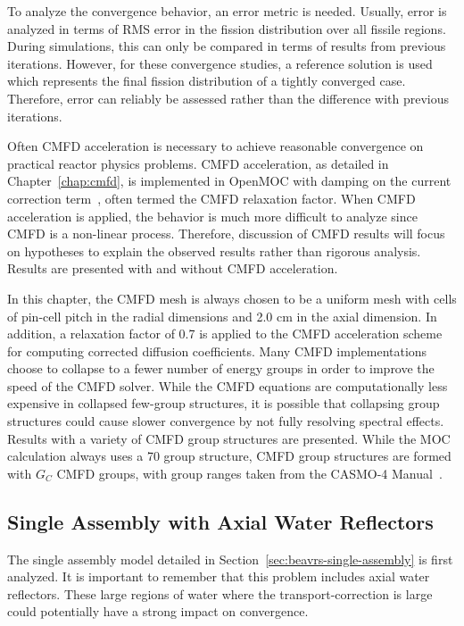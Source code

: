 To analyze the convergence behavior, an error metric is needed. Usually, error is analyzed in terms of RMS error in the fission distribution over all fissile regions. During simulations, this can only be compared in terms of results from previous iterations. However, for these convergence studies, a reference solution is used which represents the final fission distribution of a tightly converged case. Therefore, error can reliably be assessed rather than the difference with previous iterations.

Often \ac{CMFD} acceleration is necessary to achieve reasonable convergence on practical reactor physics problems. \ac{CMFD} acceleration, as detailed in Chapter~\ref{chap:cmfd}, is implemented in OpenMOC with damping on the current correction term~\cite{smith2002casmo}, often termed the \ac{CMFD} relaxation factor. When \ac{CMFD} acceleration is applied, the behavior is much more difficult to analyze since \ac{CMFD} is a non-linear process. Therefore, discussion of \ac{CMFD} results will focus on hypotheses to explain the observed results rather than rigorous analysis. Results are presented with and without \ac{CMFD} acceleration.

In this chapter, the \ac{CMFD} mesh is always chosen to be a uniform mesh with cells of pin-cell pitch in the radial dimensions and 2.0 cm in the axial dimension. In addition, a relaxation factor of 0.7 is applied to the \ac{CMFD} acceleration scheme for computing corrected diffusion coefficients. Many \ac{CMFD} implementations choose to collapse to a fewer number of energy groups in order to improve the speed of the CMFD solver. While the \ac{CMFD} equations are computationally less expensive in collapsed few-group structures, it is possible that collapsing group structures could cause slower convergence by not fully resolving spectral effects. Results with a variety of \ac{CMFD} group structures are presented. While the \ac{MOC} calculation always uses a 70 group structure, \ac{CMFD} group structures are formed with $G_C$ \ac{CMFD} groups, with group ranges taken from the CASMO-4 Manual~\cite{edenius1995casmo}.

\subsection{Single Assembly with Axial Water Reflectors}
\label{sec:sa-axial-ref}

The single assembly model detailed in Section~\ref{sec:beavrs-single-assembly} is first analyzed. It is important to remember that this problem includes axial water reflectors. These large regions of water where the transport-correction is large could potentially have a strong impact on convergence.

